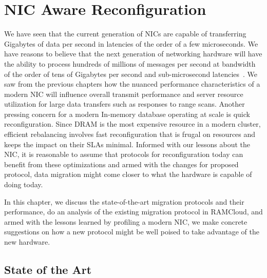 
\chapter{NIC Aware Reconfiguration}
\label{chap:migration}
We have seen that the current generation of NICs are capable of transferring Gigabytes of 
data per second in latencies of the order of a few microseconds. We have reasons to believe 
that the next generation of networking hardware will have the ability to process 
hundreds of millions of messages per second at bandwidth of the order of tens of Gigabytes per 
second and sub-microsecond latencies~\cite{cx6}.
We saw from the previous chapters how the nuanced performance characteristics of 
a modern NIC will influence overall transmit performance and server resource utilization 
for large data transfers such as responses to range scans. Another pressing 
concern for a modern In-memory database operating at scale is quick reconfiguration. 
Since DRAM is the most expensive resource in a modern cluster, efficient rebalancing 
involves fast reconfiguration that is frugal on resources and keeps the impact on their 
SLAs minimal. Informed with our lessons about the NIC, it is reasonable to assume that protocols for reconfiguration 
today can benefit from these optimizations and armed with the changes for proposed protocol, data migration might come 
closer to what the hardware is capable of doing today.

In this chapter, we discuss the state-of-the-art migration protocols and their 
performance, do an analysis of the existing migration protocol in RAMCloud, 
and armed with the lessons learned by profiling a modern NIC, we make concrete 
suggestions on how a new protocol might be well poised to take advantage of the 
new hardware.
\section{State of the Art}



